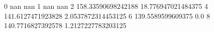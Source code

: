0 nan nan
1 nan nan
2 158.33590698242188 18.776947021484375
4 141.6127471923828 2.0537872314453125
6 139.5589599609375 0.0
8 140.7716827392578 1.2127227783203125
